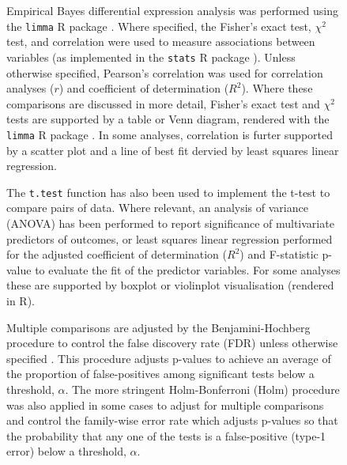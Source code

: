 \begin{figure}[!htp]
Empirical Bayes differential expression analysis was performed using the \texttt{limma} R package \citep{limma}. Where specified, the Fisher's exact test, $\chi^2$ test, and correlation were used to measure associations between variables (as implemented in the \texttt{stats} R package \citep{R_core}). Unless otherwise specified, Pearson's correlation was used for correlation analyses ($r$) and coefficient of determination ($R^2$). Where these comparisons are discussed in more detail, Fisher's exact test and $\chi^2$ tests are supported by a table or Venn diagram, rendered with the \texttt{limma} R package \citep{limma}. In some analyses, correlation is furter supported by a scatter plot and a line of best fit dervied by least squares linear regression. 

The \texttt{t.test} function \citep{R_core} has also been used to implement the t-test to compare pairs of data. Where relevant, an analysis of variance (ANOVA) has been performed to report significance of multivariate predictors of outcomes, or least squares linear regression performed for the adjusted coefficient of determination ($R^2$) and F-statistic p-value to evaluate the fit of the predictor variables. For some analyses these are supported by boxplot or violinplot visualisation (rendered in R).

Multiple comparisons are adjusted by the Benjamini-Hochberg procedure to control the false discovery rate (FDR) unless otherwise specified \citep{fdr1995}. This procedure adjusts p-values to achieve an average of the proportion of false-positives among significant tests below a threshold, $\alpha$. The more stringent Holm-Bonferroni (Holm) procedure \citep{Holm1979} was also applied in some cases to adjust for multiple comparisons and control the family-wise error rate which adjusts p-values so that the probability that any one of the tests is a false-positive (type-1 error) below a threshold, $\alpha$.


\end{figure}
